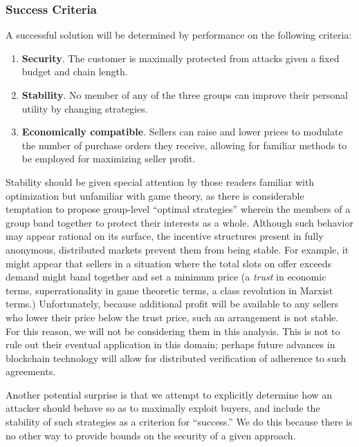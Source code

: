 \subsubsection*{Success Criteria}

A successful solution will be determined by performance on the
following criteria:

\begin{enumerate}
\item \textbf{Security}. The customer is maximally protected from
  attacks given a fixed budget and chain length.
\item \textbf{Stability}. No member of any of the three groups can
  improve their personal utility by changing strategies.
\item \textbf{Economically compatible}. Sellers can raise and lower
  prices to modulate the number of purchase orders they receive,
  allowing for familiar methods to be employed for maximizing seller
  profit.
\end{enumerate}

Stability should be given special attention by those readers familiar
with optimization but unfamiliar with game theory, as there is
considerable temptation to propose group-level ``optimal strategies''
wherein the members of a group band together to protect their
interests as a whole. Although such behavior may appear rational on
its surface, the incentive structures present in fully anonymous,
distributed markets prevent them from being stable. For example, it
might appear that sellers in a situation where the total slots on
offer exceeds demand might band together and set a minimum price (a
\emph{trust} in economic terms, superrationality\cite{metamagic} in
game theoretic terms, a class revolution in Marxist terms.)
Unfortunately, because additional profit will be available to any
sellers who lower their price below the trust price, such an
arrangement is not stable. For this reason, we will not be considering
them in this analysis. This is not to rule out their eventual
application in this domain; perhaps future advances in blockchain
technology will allow for distributed verification of adherence to
such agreements.

Another potential surprise is that we attempt to explicitly determine
how an attacker should behave so as to maximally exploit buyers, and
include the stability of such strategies as a criterion for
``success.'' We do this because there is no other way to provide
bounds on the security of a given approach.

